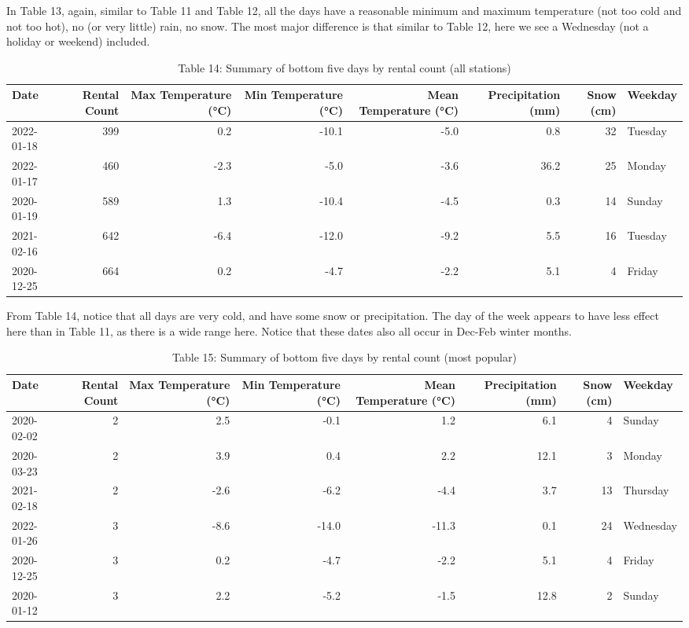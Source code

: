 \documentclass[
]{article}
\begin{document}
In Table 13, again, similar to Table 11 and Table 12, all the days have
a reasonable minimum and maximum temperature (not too cold and not too
hot), no (or very little) rain, no snow. The most major difference is
that similar to Table 12, here we see a Wednesday (not a holiday or
weekend) included.

\begin{table}[!h]

\caption{\label{tab:Table 14 conditions for minimum bike share riders (all stations)}Table 14: Summary of bottom five days by rental count (all stations)}
\centering
\begin{tabular}[t]{l|r|r|r|r|r|r|l}
\hline
Date & Rental Count & Max Temperature (°C) & Min Temperature (°C) & Mean Temperature (°C) & Precipitation (mm) & Snow (cm) & Weekday\\
\hline
2022-01-18 & 399 & 0.2 & -10.1 & -5.0 & 0.8 & 32 & Tuesday\\
\hline
2022-01-17 & 460 & -2.3 & -5.0 & -3.6 & 36.2 & 25 & Monday\\
\hline
2020-01-19 & 589 & 1.3 & -10.4 & -4.5 & 0.3 & 14 & Sunday\\
\hline
2021-02-16 & 642 & -6.4 & -12.0 & -9.2 & 5.5 & 16 & Tuesday\\
\hline
2020-12-25 & 664 & 0.2 & -4.7 & -2.2 & 5.1 & 4 & Friday\\
\hline
\end{tabular}
\end{table}

From Table 14, notice that all days are very cold, and have some snow or
precipitation. The day of the week appears to have less effect here than
in Table 11, as there is a wide range here. Notice that these dates also
all occur in Dec-Feb winter months.

\begin{table}[!h]

\caption{\label{tab:Table 15 conditions for minimum bike share riders (most popular)}Table 15: Summary of bottom five days by rental count (most popular)}
\centering
\begin{tabular}[t]{l|r|r|r|r|r|r|l}
\hline
Date & Rental Count & Max Temperature (°C) & Min Temperature (°C) & Mean Temperature (°C) & Precipitation (mm) & Snow (cm) & Weekday\\
\hline
2020-02-02 & 2 & 2.5 & -0.1 & 1.2 & 6.1 & 4 & Sunday\\
\hline
2020-03-23 & 2 & 3.9 & 0.4 & 2.2 & 12.1 & 3 & Monday\\
\hline
2021-02-18 & 2 & -2.6 & -6.2 & -4.4 & 3.7 & 13 & Thursday\\
\hline
2022-01-26 & 3 & -8.6 & -14.0 & -11.3 & 0.1 & 24 & Wednesday\\
\hline
2020-12-25 & 3 & 0.2 & -4.7 & -2.2 & 5.1 & 4 & Friday\\
\hline
2020-01-12 & 3 & 2.2 & -5.2 & -1.5 & 12.8 & 2 & Sunday\\
\hline
\end{tabular}
\end{table}
\end{document}

